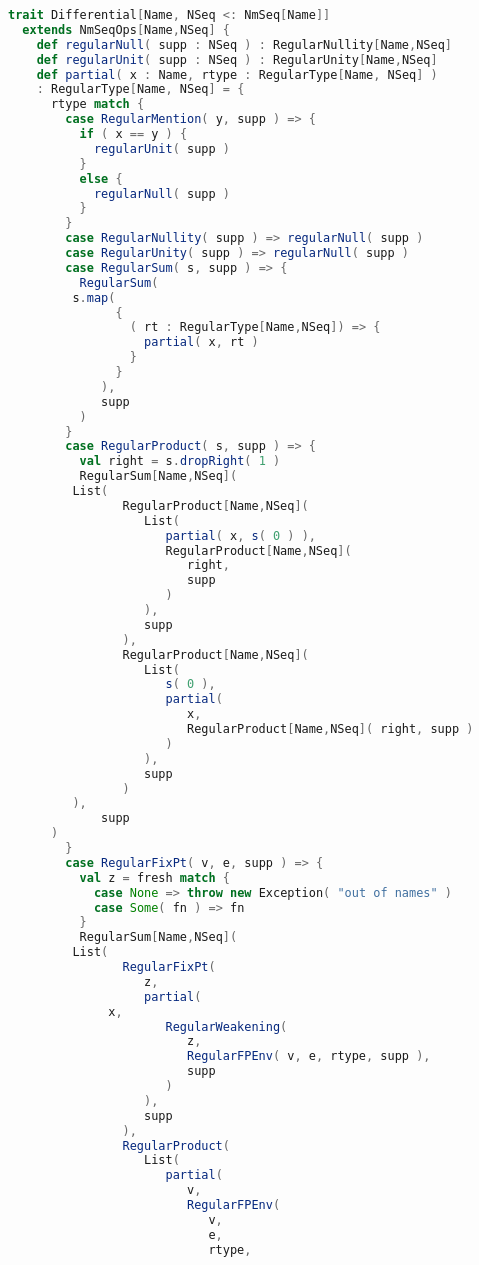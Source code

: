 \begin{lstlisting}[language=Scala,mathescape=true]
  trait Differential[Name, NSeq <: NmSeq[Name]] 
  extends NmSeqOps[Name,NSeq] {
    def regularNull( supp : NSeq ) : RegularNullity[Name,NSeq]
    def regularUnit( supp : NSeq ) : RegularUnity[Name,NSeq]
    def partial( x : Name, rtype : RegularType[Name, NSeq] )
    : RegularType[Name, NSeq] = {
      rtype match {
        case RegularMention( y, supp ) => {
          if ( x == y ) {
            regularUnit( supp )
          }
          else {
            regularNull( supp )
          }
        }
        case RegularNullity( supp ) => regularNull( supp )
        case RegularUnity( supp ) => regularNull( supp )
        case RegularSum( s, supp ) => {
          RegularSum(
	     s.map(
               {
                 ( rt : RegularType[Name,NSeq]) => {
                   partial( x, rt )
                 }
               }
             ),
             supp
          )
        }
        case RegularProduct( s, supp ) => {
          val right = s.dropRight( 1 )
          RegularSum[Name,NSeq](
	     List(
                RegularProduct[Name,NSeq](
                   List(
                      partial( x, s( 0 ) ),
                      RegularProduct[Name,NSeq](
                         right,
                         supp
                      )
                   ),
                   supp
                ),
                RegularProduct[Name,NSeq](
                   List(
                      s( 0 ),
                      partial(
                         x,
                         RegularProduct[Name,NSeq]( right, supp )
                      )
                   ),
                   supp
                )
	     ),
             supp
	  )
        }
        case RegularFixPt( v, e, supp ) => {
          val z = fresh match {
            case None => throw new Exception( "out of names" )
            case Some( fn ) => fn
          }
          RegularSum[Name,NSeq](
	     List( 
                RegularFixPt(
                   z, 
                   partial(
		      x,
                      RegularWeakening(
                         z,
                         RegularFPEnv( v, e, rtype, supp ),
                         supp
                      )
                   ),
                   supp
                ),
                RegularProduct(
                   List(
                      partial(
                         v,
                         RegularFPEnv(
                            v,
                            e,
                            rtype,

\end{lstlisting}
